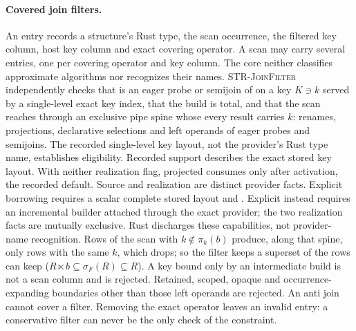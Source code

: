 \paragraph{Covered join filters.}
An entry  records a structure's Rust type, the scan
occurrence, the filtered key column, host key column and exact covering
operator. A scan may carry several entries, one per covering operator and key
column. The core neither classifies approximate algorithms nor recognizes their names.
\textsc{STR-JoinFilter} independently checks that  is an eager probe or
semijoin of  on a key $K\ni k$ served by a single-level exact key index,
that the build is total, and that the scan reaches  through an
exclusive pipe spine whose every result carries $k$: renames, projections,
declarative selections and left operands of eager probes and semijoins.
The recorded single-level key layout, not the provider's Rust type name,
establishes eligibility. Recorded  support describes the exact stored
key layout. With neither realization flag, projected  consumes
 only after activation, the recorded default.
Source  and realization  are distinct
provider facts. Explicit borrowing requires a scalar complete stored layout and
. Explicit  instead requires an
incremental  builder attached through the exact
 provider; the two realization facts are mutually
exclusive. Rust discharges these capabilities, not provider-name recognition.
Rows of the scan with $k\notin\pi_k(b)$ produce, along that spine, only rows
with the same $k$, which  drops; so the filter keeps a superset of the
rows  can keep ($R\ltimes b\subseteq\sigma_F(R)\subseteq R$). A key bound
only by an intermediate build is not a scan column and is rejected.
Retained, scoped, opaque and occurrence-expanding boundaries other than those
left operands are rejected. An anti join cannot cover
a filter. Removing the exact operator leaves an invalid entry: a conservative
filter can never be the only check of the constraint.

